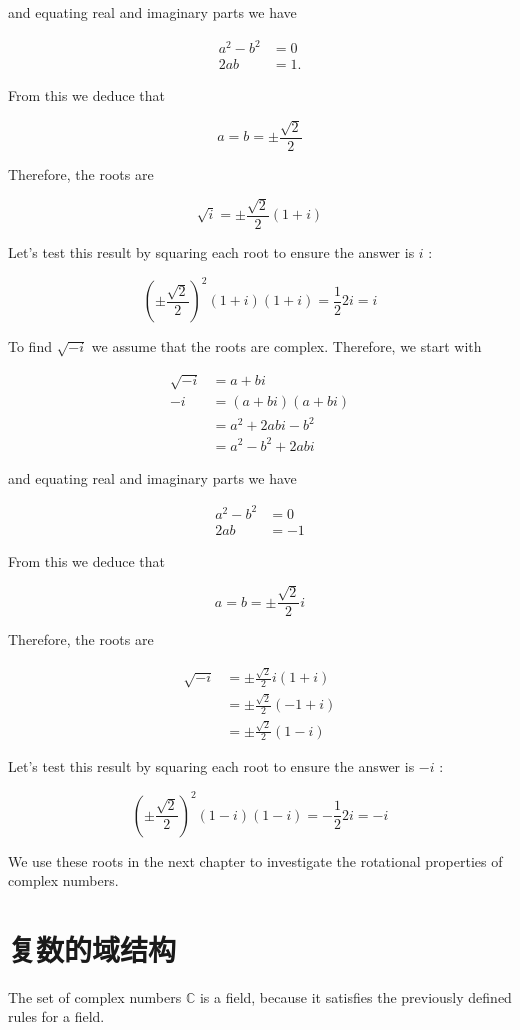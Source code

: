 and equating real and imaginary parts we have

$$
\begin{aligned}
a^{2}-b^{2} & =0 \\
2 a b & =1 .
\end{aligned}
$$

From this we deduce that

$$
a=b= \pm \frac{\sqrt{2}}{2}
$$

Therefore, the roots are

$$
\sqrt{i}= \pm \frac{\sqrt{2}}{2}(1+i)
$$

Let's test this result by squaring each root to ensure the answer is $i$ :

$$
\left( \pm \frac{\sqrt{2}}{2}\right)^{2}(1+i)(1+i)=\frac{1}{2} 2 i=i
$$

To find $\sqrt{-i}$ we assume that the roots are complex. Therefore, we start with

$$
\begin{aligned}
\sqrt{-i} & =a+b i \\
-i & =(a+b i)(a+b i) \\
& =a^{2}+2 a b i-b^{2} \\
& =a^{2}-b^{2}+2 a b i
\end{aligned}
$$

and equating real and imaginary parts we have

$$
\begin{aligned}
a^{2}-b^{2} & =0 \\
2 a b & =-1
\end{aligned}
$$

From this we deduce that

$$
a=b= \pm \frac{\sqrt{2}}{2} i
$$

Therefore, the roots are

$$
\begin{aligned}
\sqrt{-i} & = \pm \frac{\sqrt{2}}{2} i(1+i) \\
& = \pm \frac{\sqrt{2}}{2}(-1+i) \\
& = \pm \frac{\sqrt{2}}{2}(1-i)
\end{aligned}
$$

Let's test this result by squaring each root to ensure the answer is $-i$ :

$$
\left( \pm \frac{\sqrt{2}}{2}\right)^{2}(1-i)(1-i)=-\frac{1}{2} 2 i=-i
$$

We use these roots in the next chapter to investigate the rotational properties of complex numbers.

\section{复数的域结构}
The set of complex numbers $\mathbb{C}$ is a field, because it satisfies the previously defined rules for a field.

